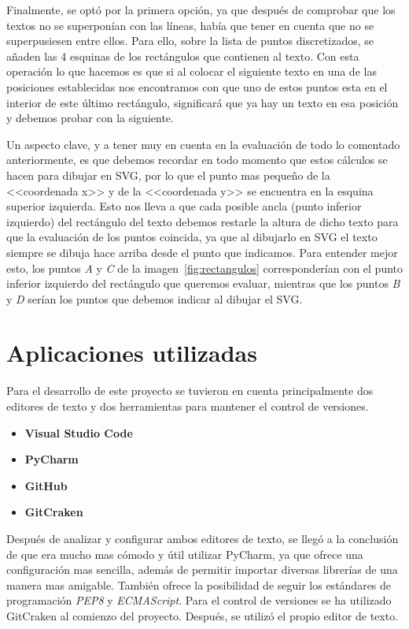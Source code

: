 Finalmente, se optó por la primera opción, ya que después de comprobar que los textos no se superponían con las líneas, había que tener en cuenta que no se superpusiesen entre ellos. Para ello, sobre la lista de puntos discretizados, se añaden las 4 esquinas de los rectángulos que contienen al texto. Con esta operación lo que hacemos es que si al colocar el siguiente texto en una de las posiciones establecidas nos encontramos con que uno de estos puntos esta en el interior de este último rectángulo, significará que ya hay un texto en esa posición y debemos probar con la siguiente.

Un aspecto clave, y a tener muy en cuenta en la evaluación de todo lo comentado anteriormente, es que debemos recordar en todo momento que estos cálculos se hacen para dibujar en SVG, por lo que el punto mas pequeño de la <<coordenada x>> y de la <<coordenada y>> se encuentra en la esquina superior izquierda. Esto nos lleva a que cada posible ancla (punto inferior izquierdo) del rectángulo del texto debemos restarle la altura de dicho texto para que la evaluación de los puntos coincida, ya que al dibujarlo en SVG el texto siempre se dibuja hace arriba desde el punto que indicamos. Para entender mejor esto, los puntos \textit{A} y \textit{C} de la imagen~\ref{fig:rectangulos} corresponderían con el punto inferior izquierdo del rectángulo que queremos evaluar, mientras que los puntos \textit{B} y \textit{D} serían los puntos que debemos indicar al dibujar el SVG.


\section{Aplicaciones utilizadas}
Para el desarrollo de este proyecto se tuvieron en cuenta principalmente dos editores de texto y dos herramientas para mantener el control de versiones.

\begin{itemize}
	\item \textbf{Visual Studio Code} 
	\item \textbf{PyCharm}
	\item \textbf{GitHub}
	\item \textbf{GitCraken}
\end{itemize}
Después de analizar y configurar ambos editores de texto, se llegó a la conclusión de que era mucho mas cómodo y útil utilizar PyCharm, ya que ofrece una configuración mas sencilla, además de permitir importar diversas librerías de una manera mas amigable. También ofrece la posibilidad de seguir los estándares de programación \textit{PEP8} y \textit{ECMAScript}.
Para el control de versiones se ha utilizado GitCraken al comienzo del proyecto. Después, se utilizó el propio editor de texto.


